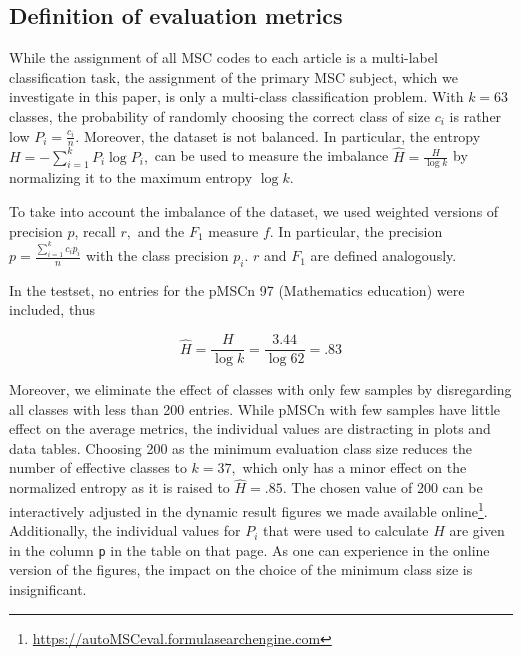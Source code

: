 \subsection{Definition of evaluation metrics}
While the assignment of all MSC codes to each article is a multi-label classification task, the assignment of the primary MSC subject, which we investigate in this paper, is only a multi-class classification problem.
With \(k = 63\) classes, the probability of randomly choosing the correct class of size \(c_{i}\) is rather low \(P_{i} = \frac{c_{i}}{n}.\)
Moreover, the dataset is not balanced.
In particular, the entropy \(
H = - \sum_{i = 1}^{k}P_{i}\log P_{i},
\) can be used to measure the imbalance \(\widehat{H} = \frac{H}{\log k}\) by normalizing it to the maximum entropy \(\log{k.}\)

To take into account the imbalance of the dataset, we used weighted versions of precision \(p\), recall \(r,\) and the \(F_{1}\) measure \(f\).
In particular, the precision \(p = \frac{\sum_{i = 1}^{k}c_{i}p_{i}}{n}\) with the class precision \(p_{i}\). \(r\) and \(F_{1}\) are defined analogously.

In the testset, no entries for the pMSCn 97 (Mathematics education) were included, thus

\[\widehat{H} = \frac{H}{\log k} = \frac{3.44}{\log 62} = .83\]

Moreover, we eliminate the effect of classes with only few samples by disregarding all classes with less than 200 entries.
While pMSCn with few samples have little effect on the average metrics, the individual values are distracting in plots and data tables.
Choosing 200 as the minimum evaluation class size reduces the number of effective classes to \(k = 37,\) which only has a minor effect on the normalized entropy as it is raised to \(\widehat{H} = .85.\)
The chosen value of 200 can be interactively adjusted in the dynamic result figures we made available online\footnote{\url{https://autoMSCeval.formulasearchengine.com}}.
Additionally, the individual values for \(P_{i}\) that were used to calculate \(H\) are given in the column \texttt{p} in the table on that page.
As one can experience in the online version of the figures, the impact on the choice of the minimum class size is insignificant.

